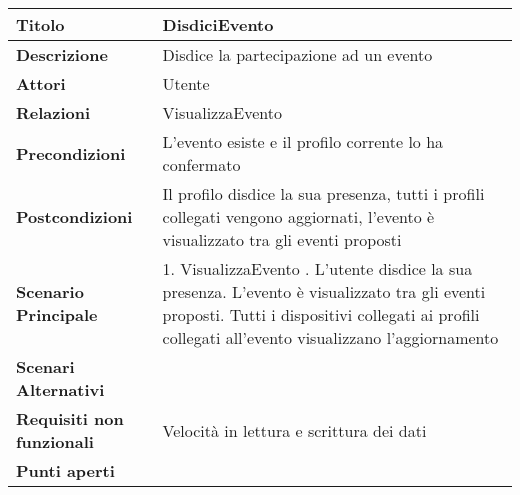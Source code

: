 \begin{tabular} {|P{4.5cm}|P{11cm}|}
  \hline
  \textbf{Titolo}                   & DisdiciEvento                                                                                                                     \\
  \hline
  \textbf{Descrizione}              & Disdice la partecipazione ad un evento                                                                                            \\
  \hline
  \textbf{Attori}                   & Utente                                                                                                                            \\
  \hline
  \textbf{Relazioni}                & VisualizzaEvento                                                                                                                  \\
  \hline
  \textbf{Precondizioni}            & L'evento esiste e il profilo corrente lo ha confermato                                                                            \\
  \hline
  \textbf{Postcondizioni}           & Il profilo disdice la sua presenza, tutti i profili collegati vengono aggiornati, l'evento è visualizzato tra gli eventi proposti \\
  \hline
  \textbf{Scenario Principale}      & 1. VisualizzaEvento . L'utente disdice la sua presenza. L'evento è visualizzato tra gli eventi proposti. Tutti i dispositivi collegati ai profili collegati all'evento visualizzano l'aggiornamento                                                                         \\
  \hline
  \textbf{Scenari Alternativi}      &                                                                                                                                   \\
  \hline
  \textbf{Requisiti non funzionali} & Velocità in lettura e scrittura dei dati                                                                                          \\
  \hline
  \textbf{Punti aperti}             &                                                                                                                                   \\
  \hline
\end{tabular}
\hfill
\break

